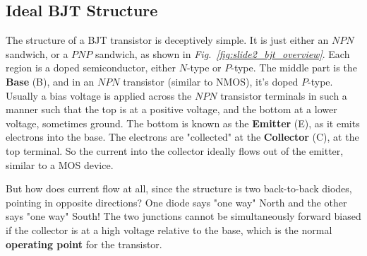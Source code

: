 \subsection{Ideal BJT Structure}
The structure of a BJT transistor is deceptively simple.  It is just either an $NPN$ sandwich, or a $PNP$ sandwich, as shown in \emph{Fig.~\ref{fig:slide2_bjt_overview}}.  Each region is a doped semiconductor, either $N$-type or $P$-type.  The middle part is the \textbf{Base} (B), and in an $NPN$ transistor (similar to NMOS), it's doped $P$-type.  Usually a bias voltage is applied across the $NPN$ transistor terminals in such a manner such that the top is at a positive voltage, and the bottom at a lower voltage, sometimes ground.  The bottom is known as the \textbf{Emitter} (E), as it emits electrons into the base.  The electrons are "collected" at the \textbf{Collector} (C), at the top terminal.  So the current into the collector ideally flows out of the emitter, similar to a MOS device.

But how does current flow at all, since the structure is two back-to-back diodes, pointing in opposite directions?  One diode says "one way" North and the other says "one way" South!  The two junctions cannot be simultaneously forward biased if the collector is at a high voltage relative to the base, which is the normal \textbf{operating point} for the transistor.

